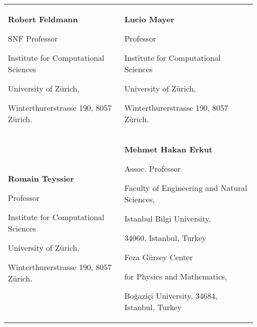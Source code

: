 

\begin{tabularx}{\textwidth}{@{}X X@{}}
\textbf{Robert Feldmann}\par
SNF Professor\par
Institute for Computational Sciences\par
University of Zürich,\par 
Winterthurerstrasse 190, 8057 Zürich.\par 
\makefield{\faEnvelopeO}{\url{feldmann@physik.uzh.ch}}
& 
\textbf{Lucio Mayer}\par
Professor\par
Institute for Computational Sciences\par
University of Zürich,\par 
Winterthurerstrasse 190, 8057 Zürich.\par 
\makefield{\faEnvelopeO}{\url{lmayer@physik.uzh.ch}}
& 
\\
\textbf{Romain Teyssier}\par
Professor\par
Institute for Computational Sciences\par
University of Zürich,\par 
Winterthurerstrasse 190, 8057 Zürich.\par 
\makefield{\faEnvelopeO}{\url{romain.teyssier@uzh.ch }}
& 
\textbf{Mehmet Hakan Erkut}\par
Assoc. Professor\par
Faculty of Engineering and Natural Sciences,\par Istanbul Bilgi University, \par 34060, Istanbul, Turkey\par
Feza G\"{u}rsey Center \par for Physics and Mathematics, \par Bo\u{g}azi\c{c}i University, 34684, Istanbul, Turkey\par
\makefield{\faEnvelopeO}{\url{mherkut@gmail.com}}
\\
\end{tabularx}
